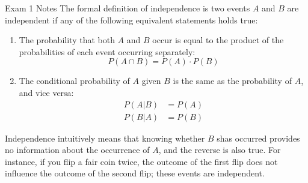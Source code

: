 \begin{examnotes}{Exam 1 Notes}
    The formal definition of independence is two events $A$ and $B$ are independent if any of the following equivalent statements holds true:
    \begin{enumerate}
        \item The probability that both $A$ and $B$ occur is equal to the product of the probabilities of each event occurring separately:
        \begin{equation*}
            P(A \cap B) = P(A) \cdot P(B)
        \end{equation*}
        \item The conditional probability of $A$ given $B$ is the same as the probability of $A$, and vice versa:
        \begin{align*}
            P(A|B) & = P(A) \\
            P(B|A) & = P(B)
        \end{align*}
    \end{enumerate}
    Independence intuitively means that knowing whether $B$ shas occurred provides no information about the occurrence of $A$, and the reverse is also true. For instance, if you flip a fair coin twice,
    the outcome of the first flip does not influence the outcome of the second flip; these events are independent.
\end{examnotes}

